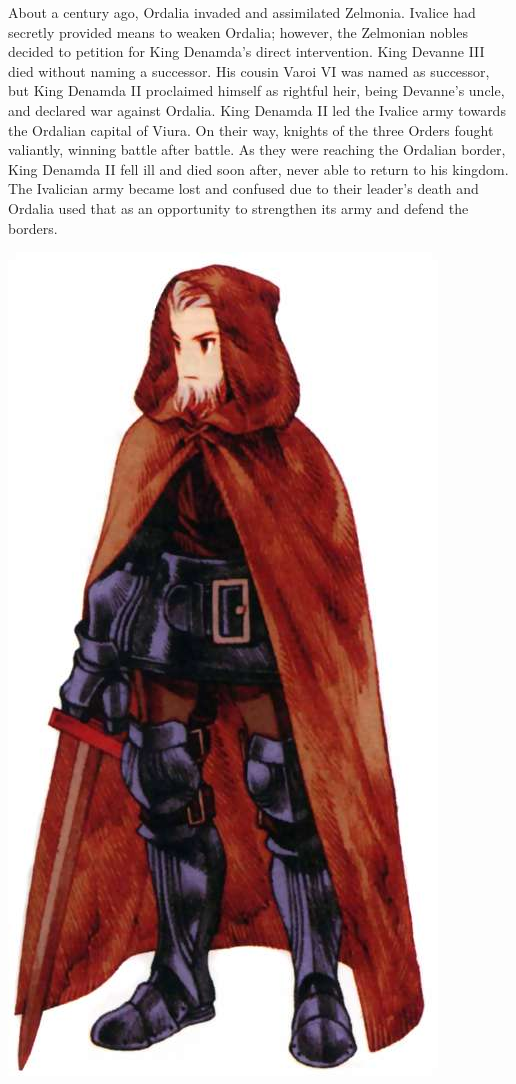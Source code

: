 About a century ago, Ordalia invaded and assimilated Zelmonia. 
Ivalice had secretly provided means to weaken Ordalia; however, the Zelmonian nobles decided to petition for King Denamda's direct intervention. 
King Devanne III died without naming a successor. 
His cousin Varoi VI was named as successor, but King Denamda II proclaimed himself as rightful heir, being Devanne's uncle, and declared war against Ordalia.
King Denamda II led the Ivalice army towards the Ordalian capital of Viura. 
On their way, knights of the three Orders fought valiantly, winning battle after battle.
As they were reaching the Ordalian border, King Denamda II fell ill and died soon after, never able to return to his kingdom. The Ivalician army became lost and confused due to their leader's death and Ordalia used that as an opportunity to strengthen its army and defend the borders. 
%
\vspace*{0.5cm}
%
\begin{center}\includegraphics[width=0.65\columnwidth]{./art/worldbook/cid.jpg}\end{center}
%
\vspace*{0.5cm}
